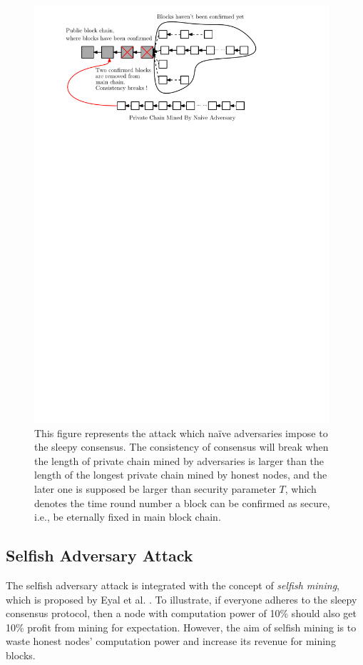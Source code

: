 \documentclass{llncs}
\begin{document}
\begin{figure}
\centering
\includegraphics[width=4.3in]{Figures/Naive-Attack.pdf}
\vspace{-3mm}
\caption{This figure represents the attack which na{\"i}ve adversaries impose to the sleepy consensus. The consistency of consensus will break when the length of private chain mined by adversaries is larger than the length of the longest private chain mined by honest nodes, and the later one is supposed be larger than security parameter $T$, which denotes the time round number a block can be confirmed as secure, i.e., be eternally fixed in main block chain.}
\label{naive}
\end{figure}
\subsection{Selfish Adversary Attack}
\quad The selfish adversary attack is integrated with the concept of \emph{selfish mining}, which is proposed by Eyal et al. \cite{Selfish-Attack}. To illustrate, if everyone adheres to the sleepy consensus protocol, then a node with computation power of 10\% should also get 10\% profit from mining for expectation.
However, the aim of selfish mining is to waste honest nodes' computation power and increase its revenue for mining blocks.
\end{document}
